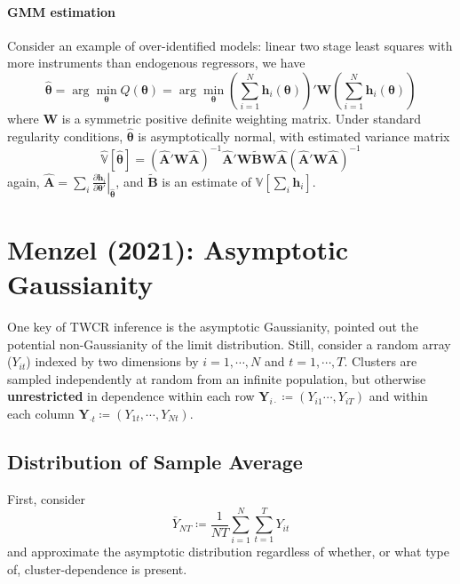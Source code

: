 \documentclass[twoside]{article}
\begin{document}
\paragraph*{GMM estimation} Consider an example of over-identified models: linear two stage least squares with more instruments than endogenous regressors, we have 
$$
\hat{\boldsymbol{\theta}} = \arg\min_{\boldsymbol{\theta}} Q(\boldsymbol{\theta}) =  \arg\min_{\boldsymbol{\theta}} \left(\sum^N_{i=1}\mathbf{h}_i(\boldsymbol{\theta})\right)'\mathbf{W}\left(\sum^N_{i=1}\mathbf{h}_i(\boldsymbol{\theta})\right)
$$
where $\mathbf{W}$ is a symmetric positive definite weighting matrix. Under standard regularity conditions, $\hat{\boldsymbol{\theta}}$ is asymptotically normal, with estimated variance matrix 
\begin{equation*}
    \hat{\mathbb{V}}\left[\hat{\boldsymbol{\theta}}\right] = \left(\hat{\mathbf{A}}'\mathbf{W}\hat{\mathbf{A}}\right)^{-1}\hat{\mathbf{A}}'\mathbf{W}\tilde{\mathbf{B}}\mathbf{W}\hat{\mathbf{A}}\left(\hat{\mathbf{A}}'\mathbf{W}\hat{\mathbf{A}}\right)^{-1}
\end{equation*}
again, $\hat{\mathbf{A}} = \sum_i \left. \frac{\partial \mathbf{h}_i}{\partial \boldsymbol{\theta}'}\right\vert _{\hat{\boldsymbol{\theta}}} $, and $\tilde{\mathbf{B}}$ is an estimate of $\mathbb{V}\left[\sum_i \mathbf{h}_i\right]$.

\section{Menzel (2021): Asymptotic Gaussianity}
One key of TWCR inference is the asymptotic Gaussianity, \citet{menzel2021bootstrap} pointed out the potential non-Gaussianity of the limit distribution.
Still, consider a random array ($Y_{it}$) indexed by two dimensions by $i=1,\cdots,N$ and $t=1,\cdots,T$. Clusters are sampled independently at random from an infinite population,
but otherwise \textbf{unrestricted} in dependence within each row $\mathbf{Y}_{i\cdot} \coloneq \left(Y_{i1}\cdots,Y_{iT}\right)$ and within each column $\mathbf{Y}_{\cdot t}\coloneq \left(Y_{1t},\cdots,Y_{Nt}\right)$.

\subsection{Distribution of Sample Average}
First, consider 
$$
\bar{Y}_{NT} \coloneq \frac{1}{NT}\sum^N_{i=1}\sum^T_{t=1}Y_{it}
$$
and approximate the asymptotic distribution regardless of whether, or what type of, cluster-dependence is present.
\end{document}
